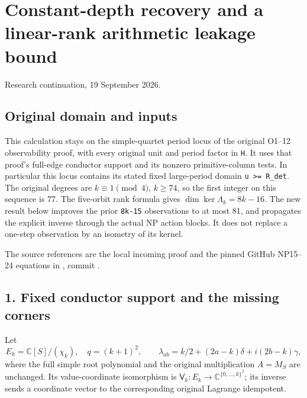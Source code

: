 \documentclass[11pt]{article}
\begin{document}
\section{Constant-depth recovery and a linear-rank arithmetic leakage bound}\label{constant-depth-recovery-and-a-linear-rank-arithmetic-leakage-bound}

Research continuation, 19 September 2026.

\subsection{Original domain and inputs}\label{original-domain-and-inputs}

This calculation stays on the simple-quartet period locus of the original O1--12 observability proof, with every original unit and period factor in \texttt{H}. It uses that proof's full-edge conductor support and its nonzero primitive-column tests. In particular this locus contains its stated fixed large-period domain \texttt{\textbar{}u\textbar{}\ \textgreater{}=\ R\_det}. The original degrees are \(k\equiv1\pmod4\), \(k\ge74\), so the first integer on this sequence is 77. The five-orbit rank formula gives \(\dim\ker\Lambda_k=8k-16\). The new result below improves the prior \texttt{8k-15} observations to at most 81, and propagates the explicit inverse through the actual NP action blocks. It does not replace a one-step observation by an isometry of its kernel.

The source references are the local incoming proof  and the pinned GitHub NP15--24 equations in , commit .

\subsection{1. Fixed conductor support and the missing corners}\label{fixed-conductor-support-and-the-missing-corners}

Let \[
E_k=\mathbb C[S]/(\chi_k),\quad q=(k+1)^2,\qquad
\lambda_{ab}=k/2+(2a-k)\delta+i(2b-k)\gamma,
\] where the full simple root polynomial and the original multiplication \(A=M_S\) are unchanged. Its value-coordinate isomorphism is \(\mathsf V_k:E_k\to\mathbb C^{\{0,\ldots,k\}^2}\); its inverse sends a coordinate vector to the corresponding original Lagrange idempotent.
\end{document}
